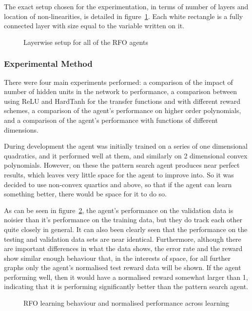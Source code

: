 The exact setup chosen for the experimentation, in terms of number of layers and location of non-linearities, is detailed in figure~\ref{fig:exactsetup}. Each white rectangle is a fully connected layer with size equal to the variable written on it. 
\begin{figure}
\centering

\caption{Layerwise setup for all of the RFO agents}
\label{fig:exactsetup}
\end{figure}


\subsubsection{Experimental Method}
There were four main experiments performed: a comparison of the impact of number of hidden units in the network to performance, a comparison between using ReLU and HardTanh for the transfer functions and with different reward schemes, a comparison of the agent's performance on higher order polynomials, and a comparison of the agent's performance with functions of different dimensions.

During development the agent was initially trained on a series of one dimensional quadratics, and it performed well at them, and similarly on 2 dimensional convex polynomials. However, on these the pattern search agent produces near perfect results, which leaves very little space for the agent to improve into. So it was decided to use non-convex quartics and above, so that if the agent can learn something better, there would be space for it to do so.

As can be seen in figure~\ref{fig:opt1norm}, the agent's performance on the validation data is noisier than it's performance on the training data, but they do track each other quite closely in general. It can also been clearly seen that the performance on the testing and validation data sets are near identical. Furthermore, although there are important differences in what the data shows, the error rate and the reward show similar enough behaviour that, in the interests of space, for all further graphs only the agent's normalised test reward data will be shown. If the agent performing well, then it would have a normalised reward somewhat larger than 1, indicating that it is performing significantly better than the pattern search agent.


\begin{figure}
\centering


\caption{RFO learning behaviour and normalised performance across learning}
\label{fig:opt1norm}
\end{figure}

